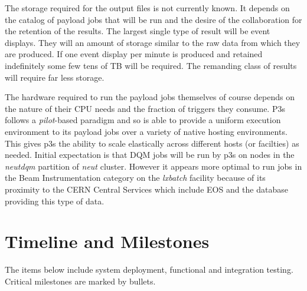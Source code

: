 \documentclass[pdftex,12pt,letter]{article}
\begin{document}
The storage required for the output files is not currently known.  It
depends on the catalog of payload jobs that will be run and the desire
of the collaboration for the retention of the results.  The largest
single type of result will be event displays.  They will an amount of
storage similar to the raw data from which they are produced.  If one
event display per minute is produced and retained indefinitely some
few tens of TB will be required.  The remanding class of results will
require far less storage.

The hardware required to run the payload jobs themselves of course
depends on the nature of their CPU needs and the fraction of triggers
they consume.  P3s follows a \textit{pilot}-based paradigm and so is
able to provide a uniform execution environment to its payload jobs
over a variety of native hosting environments.  This gives p3s the ability
to scale elastically across different hosts (or facilties) as needed.  Initial expectation
is that DQM jobs will be run by p3s on nodes in the \textit{neutdqm}
partition of \textit{neut} cluster. However it appears more optimal
to run jobs in the Beam Instrumentation category on the
\textit{lxbatch} \cite{lxbatch} facility because of its proximity to
the CERN Central Services which include EOS and the database
providing this type of data.

\section{Timeline and Milestones}
\label{sec:timeline}
The items below include system deployment, functional and integration testing.
Critical milestones are marked by bullets.
\end{document}
